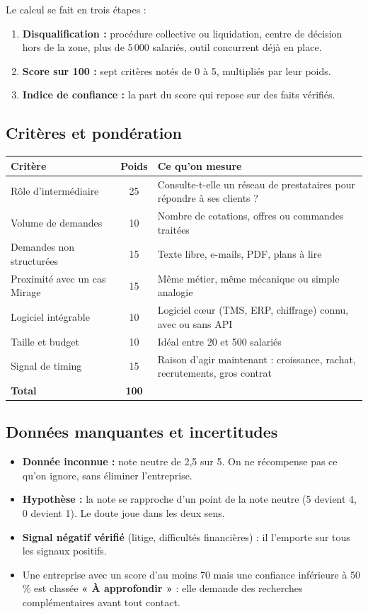 \documentclass[11pt,a4paper]{article}
\begin{document}
Le calcul se fait en trois étapes :
\begin{enumerate}
  \item \textbf{Disqualification :} procédure collective ou liquidation, centre de décision hors de la zone, plus de 5\,000 salariés, outil concurrent déjà en place.
  \item \textbf{Score sur 100 :} sept critères notés de 0 à 5, multipliés par leur poids.
  \item \textbf{Indice de confiance :} la part du score qui repose sur des faits vérifiés.
\end{enumerate}

\subsection{Critères et pondération}
\begin{center}
\small
\begin{tabularx}{\textwidth}{@{}l c X@{}}
\toprule
\textbf{Critère} & \textbf{Poids} & \textbf{Ce qu'on mesure} \\
\midrule
Rôle d'intermédiaire & 25 & Consulte-t-elle un réseau de prestataires pour répondre à ses clients ? \\
Volume de demandes & 10 & Nombre de cotations, offres ou commandes traitées \\
Demandes non structurées & 15 & Texte libre, e-mails, PDF, plans à lire \\
Proximité avec un cas Mirage & 15 & Même métier, même mécanique ou simple analogie \\
Logiciel intégrable & 10 & Logiciel cœur (TMS, ERP, chiffrage) connu, avec ou sans API \\
Taille et budget & 10 & Idéal entre 20 et 500 salariés \\
Signal de timing & 15 & Raison d'agir maintenant : croissance, rachat, recrutements, gros contrat \\
\midrule
\textbf{Total} & \textbf{100} & \\
\bottomrule
\end{tabularx}
\end{center}

\subsection{Données manquantes et incertitudes}
\begin{itemize}
  \item \textbf{Donnée inconnue :} note neutre de 2,5 sur 5. On ne récompense pas ce qu'on ignore, sans éliminer l'entreprise.
  \item \textbf{Hypothèse :} la note se rapproche d'un point de la note neutre (5 devient 4, 0 devient 1). Le doute joue dans les deux sens.
  \item \textbf{Signal négatif vérifié} (litige, difficultés financières) : il l'emporte sur tous les signaux positifs.
  \item Une entreprise avec un score d'au moins 70 mais une confiance inférieure à 50 \% est classée \textbf{« À approfondir »} : elle demande des recherches complémentaires avant tout contact.
\end{itemize}
\end{document}
